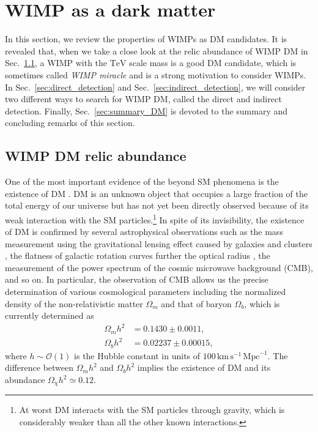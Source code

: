 \documentclass[12pt,twoside,book]{article}
\begin{document}
\section{WIMP as a dark matter}
\setcounter{equation}{0}
\label{sec:DM}

\vskip 0.1in

In this section, we review the properties of WIMPs as DM candidates.
It is revealed that, when we take a close look at the relic abundance of WIMP DM in Sec.~\ref{sec:relic}, a WIMP with the $\mathrm{TeV}$ scale mass is a good DM candidate, which is sometimes called \textit{WIMP miracle} and is a strong motivation to consider WIMPs.
In Sec.~\ref{sec:direct_detection} and Sec.~\ref{sec:indirect_detection}, we will consider two different ways to search for WIMP DM, called the direct and indirect detection.
Finally, Sec.~\ref{sec:summary_DM} is devoted to the summary and concluding remarks of this section.


\subsection{WIMP DM relic abundance}
\label{sec:relic}

One of the most important evidence of the beyond SM phenomena is the existence of DM \cite{Zwicky:1933}.
DM is an unknown object that occupies a large fraction of the total energy of our universe but has not yet been directly observed because of its weak interaction with the SM particles.\footnote{
  At worst DM interacts with the SM particles through gravity, which is considerably weaker than all the other known interactions.
}
In spite of its invisibility, the existence of DM is confirmed by several astrophysical observations such as the mass measurement using the gravitational lensing effect caused by galaxies and clusters \cite{Zwicky:1937, Trimble:1987ee}, the flatness of galactic rotation curves further the optical radius \cite{1939LicOB..19...41B, Begeman:1991iy}, the measurement of the power spectrum of the cosmic microwave background (CMB), and so on.
In particular, the observation of CMB allows us the precise determination of various cosmological parameters \cite{Jungman:1995av, Jungman:1995bz} including the normalized density of the non-relativistic matter $\Omega_m$ and that of baryon $\Omega_b$, which is currently determined as \cite{Aghanim:2018eyx}
\begin{align}
  \Omega_m h^2 &= 0.1430 \pm 0.0011,\\
  \Omega_b h^2 &= 0.02237 \pm 0.00015,
\end{align}
where $h \sim \mathcal{O}(1)$ is the Hubble constant in units of $100\, \mathrm{km}\, \mathrm{s}^{-1}\, \mathrm{Mpc}^{-1}$.
The difference between $\Omega_m h^2$ and $\Omega_b h^2$ implies the existence of DM and its abundance $\Omega_\chi h^2 \simeq 0.12$.
\end{document}
